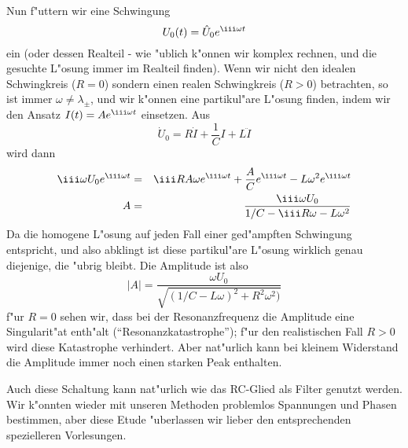 Nun f"uttern wir eine Schwingung 
$$U_0(t) = \hat U_0 e^{\iii\omega t}$$
ein (oder dessen Realteil - wie "ublich k"onnen wir komplex rechnen, und die
gesuchte L"osung immer im Realteil finden). Wenn wir nicht den idealen
Schwingkreis ($R=0$) sondern einen realen Schwingkreis ($R>0$) betrachten, so ist immer $\omega\not = \lambda_\pm$, und wir k"onnen
eine partikul"are L"osung finden, indem wir den Ansatz  $I(t) = A e^{\iii\omega t}$ einsetzen.
Aus 
$$
\dot U_0 =  R \dot I + \frac 1 C  I + L \ddot I 
$$
wird dann
\begin{eqnarray*}
\iii\omega U_0 e^{\iii\omega t} & = & \iii R A  \omega e^{\iii\omega t} +\frac A C e^{\iii\omega t} - L \omega^2e^{\iii\omega t}\\
A & = & \frac{\iii\omega U_0}{1/C - \iii R\omega - L\omega^2}
\end{eqnarray*}
Da die homogene L"osung auf jeden Fall einer ged"ampften Schwingung entspricht, und also abklingt ist diese 
partikul"are L"osung wirklich genau diejenige, die "ubrig bleibt. 
Die Amplitude ist also
$$ |A| = \frac{\omega U_0}{\sqrt{(1/C-L\omega)^2+ R^2 \omega^2)}}$$
f"ur $R=0$ sehen wir, dass bei der Resonanzfrequenz die Amplitude eine Singularit"at enth"alt (``Resonanzkatastrophe''); f"ur den realistischen Fall $R>0$ wird diese Katastrophe verhindert. Aber nat"urlich
kann bei kleinem Widerstand die Amplitude immer noch einen starken Peak enthalten.

Auch diese Schaltung kann nat"urlich wie das RC-Glied als Filter genutzt werden. Wir k"onnten wieder 
mit unseren Methoden problemlos Spannungen und Phasen bestimmen, aber diese Etude "uberlassen wir 
lieber den entsprechenden spezielleren Vorlesungen.


